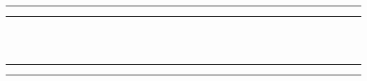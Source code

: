 \documentclass[11pt]{article}
\begin{document}
\begin{enumerate}
    \begin{left}
        \rule{0.5\textwidth}{.4pt}
    \end{left}
    \begin{left}
        \rule{0.5\textwidth}{.4pt}
    \end{left}\\\\
    \begin{left}
        \rule{0.5\textwidth}{.4pt}
    \end{left}
    \begin{left}
        \rule{0.5\textwidth}{.4pt}
    \end{left}
    
\end{enumerate}
\end{document}
